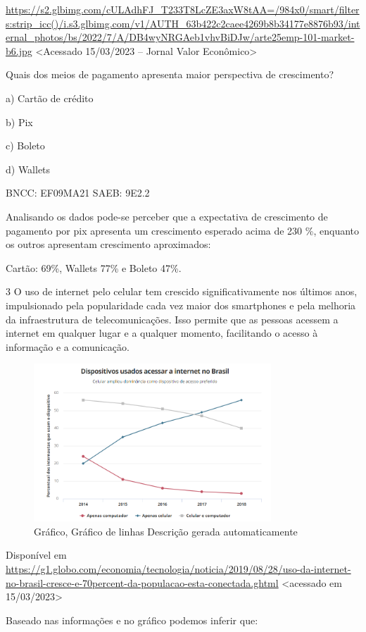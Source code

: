 \begin{escolha}
{{{\begin{escolha}
{{{{{\begin{escolha}
\begin{escolha}
{\begin{q°}
\url{https://s2.glbimg.com/cULAdhFJ_T233T8LcZE3axW8tAA=/984x0/smart/filters:strip_icc()/i.s3.glbimg.com/v1/AUTH_63b422c2caee4269b8b34177e8876b93/internal_photos/bs/2022/7/A/DB4wyNRGAeb1vhvBiDJw/arte25emp-101-market-b6.jpg}
\textless Acessado 15/03/2023 -- Jornal Valor Econômico\textgreater{}

Quais dos meios de pagamento apresenta maior perspectiva de crescimento?

a) Cartão de crédito

b) Pix

c) Boleto

d) Wallets

BNCC: EF09MA21 SAEB: 9E2.2

Analisando os dados pode-se perceber que a expectativa de crescimento de
pagamento por pix apresenta um crescimento esperado acima de 230 \%,
enquanto os outros apresentam crescimento aproximados:

Cartão: 69\%, Wallets 77\% e Boleto 47\%.

\num{3} O uso de internet pelo celular tem crescido significativamente nos
últimos anos, impulsionado pela popularidade cada vez maior dos
smartphones e pela melhoria da infraestrutura de telecomunicações. Isso
permite que as pessoas acessem a internet em qualquer lugar e a qualquer
momento, facilitando o acesso à informação e a comunicação.

\begin{figure}
\centering
\includegraphics[width=3.50825in,height=2.33333in]{./_SAEB_9_MAT/media/image226.png}
\caption{Gráfico, Gráfico de linhas Descrição gerada automaticamente}
\end{figure}

Disponível em
\url{https://g1.globo.com/economia/tecnologia/noticia/2019/08/28/uso-da-internet-no-brasil-cresce-e-70percent-da-populacao-esta-conectada.ghtml}
\textless acessado em 15/03/2023\textgreater{}

Baseado nas informações e no gráfico podemos inferir que:


\end{q°}}
\end{escolha}
\end{escolha}}}}}}
\end{escolha}}}}
\end{escolha}
